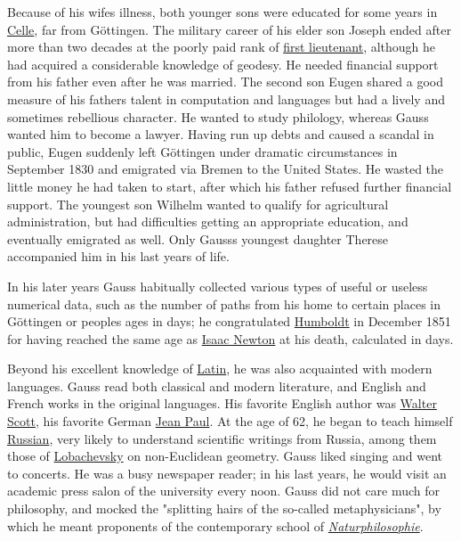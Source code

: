 Because of his wife\textquotesingle s illness, both younger sons were educated for some years in \href{https://en.wikipedia.org/wiki/Celle}{Celle}, far from Göttingen. The military career of his elder son Joseph ended after more than two decades at the poorly paid rank of \href{https://en.wikipedia.org/wiki/First_lieutenant}{first lieutenant}, although he had acquired a considerable knowledge of geodesy. He needed financial support from his father even after he was married. The second son Eugen shared a good measure of his father\textquotesingle s talent in computation and languages but had a lively and sometimes rebellious character. He wanted to study philology, whereas Gauss wanted him to become a lawyer. Having run up debts and caused a scandal in public, Eugen suddenly left Göttingen under dramatic circumstances in September 1830 and emigrated via Bremen to the United States. He wasted the little money he had taken to start, after which his father refused further financial support. The youngest son Wilhelm wanted to qualify for agricultural administration, but had difficulties getting an appropriate education, and eventually emigrated as well. Only Gauss\textquotesingle s youngest daughter Therese accompanied him in his last years of life.

In his later years Gauss habitually collected various types of useful or useless numerical data, such as the number of paths from his home to certain places in Göttingen or peoples\textquotesingle{} ages in days; he congratulated \href{https://en.wikipedia.org/wiki/Alexander_von_Humboldt}{Humboldt} in December 1851 for having reached the same age as \href{https://en.wikipedia.org/wiki/Isaac_Newton}{Isaac Newton} at his death, calculated in days.

Beyond his excellent knowledge of \href{https://en.wikipedia.org/wiki/Latin}{Latin}, he was also acquainted with modern languages. Gauss read both classical and modern literature, and English and French works in the original languages. His favorite English author was \href{https://en.wikipedia.org/wiki/Walter_Scott}{Walter Scott}, his favorite German \href{https://en.wikipedia.org/wiki/Jean_Paul}{Jean Paul}. At the age of 62, he began to teach himself \href{https://en.wikipedia.org/wiki/Russian_language}{Russian}, very likely to understand scientific writings from Russia, among them those of \href{https://en.wikipedia.org/wiki/Nikolai_Lobachevsky}{Lobachevsky} on non-Euclidean geometry. Gauss liked singing and went to concerts. He was a busy newspaper reader; in his last years, he would visit an academic press salon of the university every noon. Gauss did not care much for philosophy, and mocked the "splitting hairs of the so-called metaphysicians", by which he meant proponents of the contemporary school of \emph{\href{https://en.wikipedia.org/wiki/Naturphilosophie}{Naturphilosophie}}.

